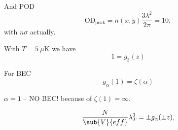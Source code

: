 And POD
\begin{equation*}
	\text{OD}_{\text{peak}} = n(x, y) \frac{3 \lambda^2}{2\pi} = 10,
\end{equation*}
with $n \sigma$ actually.

With $T = 5 \ \mu\text{K}$ we have
\begin{equation*}
	1 = g_3 (z)
\end{equation*}

% 



For BEC
\begin{equation*}
	g_\alpha(1) = \zeta(\alpha)
\end{equation*}

$\alpha = 1$ -- NO BEC! because of $\zeta(1) = \infty$.


\begin{equation*}
	\frac{N}{\sub{V}{eff}} \lambda_T^3 =\pm g_\alpha (\pm z),
\end{equation*}

% 